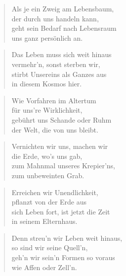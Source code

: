\documentclass[10pt,a4paper]{article}
\begin{document}
\begin{paracol}{2}
\begin{verse}
Als je ein Zweig am Lebensbaum, \\
der durch uns handeln kann, \\
geht sein Bedarf nach Lebensraum \\
uns ganz persönlich an. \\
\end{verse}

\begin{verse}
Das Leben muss sich weit hinaus \\
vermehr’n, sonst sterben wir, \\
stirbt Unsereins als Ganzes aus \\
in diesem Kosmos hier. \\
\end{verse}

\begin{verse}
Wie Vorfahren im Altertum \\
für uns’re Wirklichkeit, \\
gebührt uns Schande oder Ruhm \\
der Welt, die von uns bleibt. \\
\end{verse}

\begin{verse}
Vernichten wir uns, machen wir \\
die Erde, wo’s uns gab, \\
zum Mahnmal unseres Krepier’ns, \\
zum unbeweinten Grab. \\
\end{verse}

\begin{verse}
Erreichen wir Unendlichkeit, \\
pflanzt von der Erde aus \\
sich Leben fort, ist jetzt die Zeit \\
in seinem Elternhaus. \\
\end{verse}

\begin{verse}
Denn streu’n wir Leben weit hinaus, \\
so sind wir seine Quell’n, \\
geh’n wir sein’n Formen so voraus \\
wie Affen oder Zell’n. \\
\end{verse}


\end{paracol}
\end{document}
